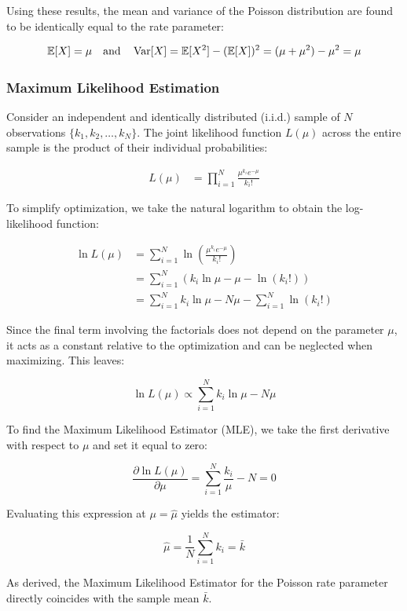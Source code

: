 Using these results, the mean and variance of the Poisson distribution are found to be identically equal to the rate parameter:

	\[
	\mathbb{E}[X] = \mu \quad \text{and} \quad \operatorname{Var}[X] = \mathbb{E}[X^2] - (\mathbb{E}[X])^2 = (\mu + \mu^2) - \mu^2 = \mu
	\]

\subsubsection{Maximum Likelihood Estimation}
Consider an independent and identically distributed (i.i.d.) sample of $N$ observations $\{k_1, k_2, \dots, k_N\}$. The joint likelihood function $L(\mu)$ across the entire sample is the product of their individual probabilities:

\begin{align*}
	L(\mu) &= \prod_{i=1}^N \frac{\mu^{k_i} e^{-\mu}}{k_i!}
\end{align*}

To simplify optimization, we take the natural logarithm to obtain the log-likelihood function:

\begin{align*}
	\ln L(\mu) &= \sum_{i=1}^N \ln \left( \frac{\mu^{k_i} e^{-\mu}}{k_i!} \right) \\
	&= \sum_{i=1}^N \left( k_i \ln \mu - \mu - \ln(k_i!) \right) \\
	&= \sum_{i=1}^N k_i \ln \mu - N\mu - \sum_{i=1}^N \ln(k_i!)
\end{align*}

Since the final term involving the factorials does not depend on the parameter $\mu$, it acts as a constant relative to the optimization and can be neglected when maximizing. This leaves:

	\[
	\ln L(\mu) \propto \sum_{i=1}^N k_i \ln \mu - N\mu
	\]

To find the Maximum Likelihood Estimator (MLE), we take the first derivative with respect to $\mu$ and set it equal to zero:

	\[
	\frac{\partial \ln L(\mu)}{\partial \mu} = \sum_{i=1}^N \frac{k_i}{\mu} - N = 0
	\]

Evaluating this expression at $\mu = \hat{\mu}$ yields the estimator:

\begin{equation}
	\hat{\mu} = \frac{1}{N} \sum_{i=1}^N k_i = \bar{k}
	\label{eq:poisson_mle}
\end{equation}

As derived, the Maximum Likelihood Estimator for the Poisson rate parameter directly coincides with the sample mean $\bar{k}$. 

